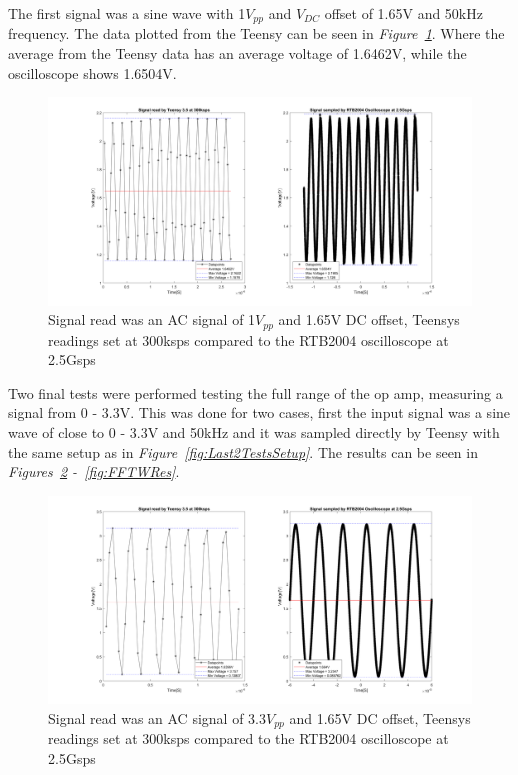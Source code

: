 \clearpage

The first signal was a sine wave with 1$V_{pp}$ and $V_{DC}$ offset of 1.65V and 50kHz frequency.
The data plotted from the Teensy can be seen in \textit{Figure~\ref{fig:OscilloCompTeensyAC}}.
Where the average from the Teensy data has an average voltage of 1.6462V, while the oscilloscope shows 1.6504V.

\begin{figure}[h]
    \centering
    \includegraphics[width=1.0\textwidth]{graphics/OscilloTeensyAC50k1vpp165voffpng.png}
    \caption{Signal read was an AC signal of 1$V_{pp}$ and 1.65V DC offset, Teensys readings set at 300ksps compared to the RTB2004 oscilloscope at 2.5Gsps}
    \label{fig:OscilloCompTeensyAC}
\end{figure}

Two final tests were performed testing the full range of the op amp, measuring a signal from 0 - 3.3V.
This was done for two cases, first the input signal was a sine wave of close to 0 - 3.3V and 50kHz and it was sampled directly by Teensy with the same setup as in \textit{Figure~\ref{fig:Last2TestsSetup}}.
The results can be seen in \textit{Figures~\ref{fig:MeasurWRes}  -~\ref{fig:FFTWRes}}.

\begin{figure}[h]
    \centering
    \includegraphics[width=1.0\textwidth]{graphics/MeasurWRes.png}
    \caption{Signal read was an AC signal of 3.3$V_{pp}$ and 1.65V DC offset, Teensys readings set at 300ksps compared to the RTB2004 oscilloscope at 2.5Gsps}
    \label{fig:MeasurWRes}
\end{figure}


